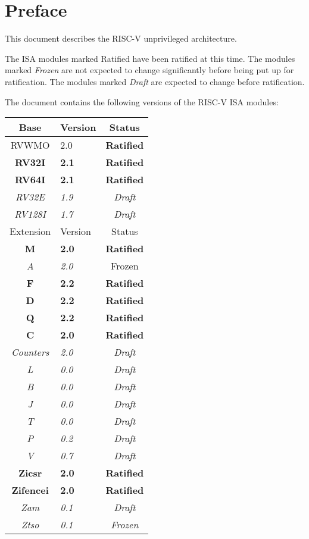 \chapter{Preface}

This document describes the RISC-V unprivileged architecture.

The ISA modules marked Ratified have been ratified at this time.  The modules
marked {\em Frozen} are not expected to change significantly before being put
up for ratification.  The modules marked {\em Draft} are expected to change
before ratification.

The document contains the following versions of the RISC-V ISA modules:

{
\begin{table}[hbt]
  \centering
  \begin{tabular}{|c|l|c|}
    \hline
    Base           & Version & Status\\
    \hline
    RVWMO          & 2.0 & \bf Ratified   \\
    \bf RV32I      & \bf 2.1 & \bf Ratified \\
    \bf RV64I      & \bf 2.1 & \bf Ratified \\
    \em RV32E      & \em 1.9 & \em Draft \\
    \em RV128I     & \em 1.7 & \em Draft \\
    \hline
    Extension      & Version & Status \\
    \hline
    \bf M          & \bf 2.0 & \bf Ratified \\
    \em A          & \em 2.0 &  Frozen \\
    \bf F          & \bf 2.2 & \bf Ratified \\
    \bf D          & \bf 2.2 & \bf Ratified \\
    \bf Q          & \bf 2.2 & \bf Ratified \\
    \bf C          & \bf 2.0 & \bf Ratified \\
    \em Counters   & \em 2.0 & \em Draft \\
    \em L          & \em 0.0 & \em Draft \\
    \em B          & \em 0.0 & \em Draft \\
    \em J          & \em 0.0 & \em Draft \\
    \em T          & \em 0.0 & \em Draft \\
    \em P          & \em 0.2 & \em Draft \\
    \em V          & \em 0.7 & \em Draft \\
    \bf Zicsr      & \bf 2.0 & \bf Ratified \\
    \bf Zifencei   & \bf 2.0 & \bf Ratified \\
    \em Zam        & \em 0.1 & \em Draft \\
    \em Ztso       & \em 0.1 & \em Frozen \\
    \hline
  \end{tabular}
\end{table}
}

